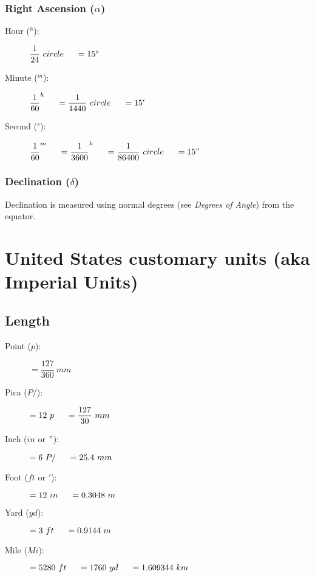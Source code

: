 \subsubsection{Right Ascension ($\alpha$)}

\begin{description}
\item[Hour ($^h$):] \( \dfrac{1}{24}\ circle \tab[0.5cm]= 15 \degrees \)
\item[Minute ($^m$):] \( \dfrac{1}{60} ^h \tab[0.5cm]= \dfrac{1}{1440}\ circle \tab[0.5cm]= 15' \)
\item[Second ($^s$):] \( \dfrac{1}{60} ^m \tab[0.5cm]= \dfrac{1}{3600} ^h \tab[0.5cm]= \dfrac{1}{86400}\ circle \tab[0.5cm]= 15" \) 

\end{description}

\subsubsection{Declination ($\delta$)}
Declination is measured using normal degrees (see \textit{Degrees of Angle}) from the equator.


\section{United States customary units (aka Imperial Units)}

\subsection{Length}
\begin{description}
\item[Point ($p$):]$ = \dfrac{127}{360}\ mm$

\item[Pica ($P/$):]$ = 12\ p \tab[0.5cm]= \dfrac{127}{30}\ mm$

\item[Inch ($in$ or $"$):]$ = 6\ P/  \tab[0.5cm]= 25.4\ mm$

\item[Foot ($ft$ or $'$):]$ = 12\ in \tab[0.5cm]= 0.3048\ m$

\item[Yard ($yd$):]$ = 3\ ft \tab[0.5cm]= 0.9144\ m$

\item[Mile ($Mi$):]$ = 5280\ ft \tab[0.5cm] = 1760\ yd \tab[0.5cm] = 1.609344\ km $
\end{description}

